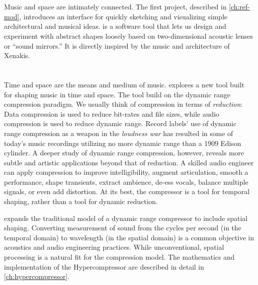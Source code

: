 \section{}
\label{sec:refmod-intro}
Music and space are intimately connected. The first
project, described in \autoref{ch:ref-mod}, introduces an interface
for quickly sketching and visualizing simple architectural and musical
ideas.  is a software tool that lets us design and experiment
with abstract shapes loosely based on two-dimensional acoustic lenses
or ``sound mirrors.'' It is directly inspired by the music and
architecture of Xenakis.

\section{\thesis}
\label{sec:hypercompression-intro}
Time and space are the means and medium of music. \thesis
explores a new tool built for shaping music in time and space. The
tool build on the dynamic range compression paradigm.  We usually
think of compression in terms of \emph{reduction}: Data compression is
used to reduce bit-rates and file sizes, while audio compression is
used to reduce dynamic range. Record labels' use of dynamic range
compression as a weapon in the \emph{loudness
  war}\cite[-5mm]{Deruty2014a} has resulted in some of today's music
recordings utilizing no more dynamic range than a 1909 Edison
cylinder.\cite{Katz2007} A deeper study of dynamic range compression,
however, reveals more subtle and artistic applications beyond that of
reduction. A skilled audio engineer can apply compression to improve
intelligibility, augment articulation, smooth a performance, shape
transients, extract ambience, de-ess vocals, balance multiple signals,
or even add distortion.\cite{Case2007} At its best, the compressor is
a tool for temporal shaping, rather than a tool for dynamic reduction.

\thesis expands the traditional model of a dynamic range compressor to
include spatial shaping.  Converting measurement of sound from the
cycles per second (in the temporal domain) to wavelength (in the
spatial domain) is a common objective in acoustics and audio
engineering practices.\cite{Davis1989} While unconventional, spatial
processing is a natural fit for the compression model. The mathematics
and implementation of the Hypercompressor are described in detail in
\autoref{ch:hypercompressor}.

